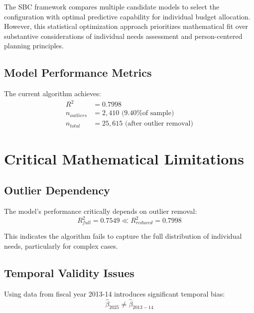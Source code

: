 The SBC framework compares multiple candidate models to select the configuration with optimal predictive capability for individual budget allocation. However, this statistical optimization approach prioritizes mathematical fit over substantive considerations of individual needs assessment and person-centered planning principles.

\subsection{Model Performance Metrics}

The current algorithm achieves:
\begin{align}
R^2 &= 0.7998 \\
n_{outliers} &= 2,410 \text{ (9.40\% of sample)} \\
n_{total} &= 25,615 \text{ (after outlier removal)}
\end{align}

\section{Critical Mathematical Limitations}
\subsection{Outlier Dependency}
The model's performance critically depends on outlier removal:
\begin{equation}
R^2_{full} = 0.7549 \ll R^2_{reduced} = 0.7998
\end{equation}

This indicates the algorithm fails to capture the full distribution of individual needs, particularly for complex cases.

\subsection{Temporal Validity Issues}
Using data from fiscal year 2013-14 introduces significant temporal bias:
\begin{equation}
\hat{\beta}_{2025} \neq \hat{\beta}_{2013-14}
\end{equation}

